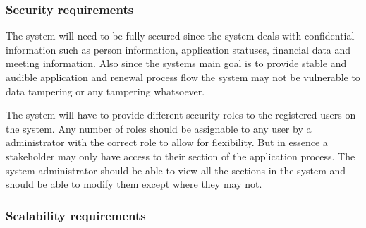 \documentclass[12pt]{article}
\begin{document}
\subsubsection{Security requirements}

\begin{flushleft}

The system will need to be fully secured since the system deals with confidential information such as person information, application statuses, financial data and meeting information. Also since the systems main goal is to provide stable and audible application and renewal process flow the system may not be vulnerable to data tampering or any tampering whatsoever. \\
\vspace{0.1in}

The system will have to provide different security roles to the registered users on the system. Any number of roles should be assignable to any user by a administrator with the correct role to allow for flexibility.
But in essence a stakeholder may only have access to their section of the application process. The system administrator should be able to view all the sections in the system and should be able to modify them except where they may not.

\end{flushleft}

\vspace{0.1in}

\subsubsection{Scalability requirements}
\end{document}
